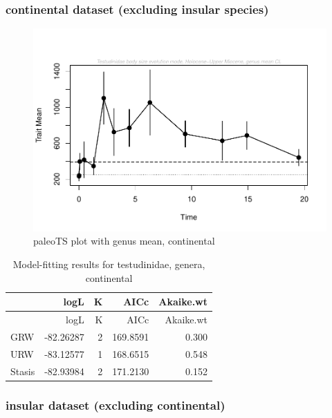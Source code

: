 \FloatBarrier

\subsubsection{continental dataset (excluding insular
	species)}\label{continental-excluding-insular-species}


\begin{figure}[H]
	\centering
	\includegraphics{MA_JJ_files/figure-latex/paleoTSC-1.pdf}
	\caption{paleoTS plot with genus mean, continental}
	\label{fig:pTSC}
\end{figure}

\begin{longtable}[]{@{}lrrrr@{}}
	\caption{Model-fitting results for testudinidae, genera,
		continental}
	\label{tab:pTSCEM}\tabularnewline
	\toprule
	& logL & K & AICc & Akaike.wt\tabularnewline
	\midrule
	\endfirsthead
	\toprule
	& logL & K & AICc & Akaike.wt\tabularnewline
	\midrule
	\endhead
	GRW & -82.26287 & 2 & 169.8591 & 0.300\tabularnewline
	URW & -83.12577 & 1 & 168.6515 & 0.548\tabularnewline
	Stasis & -82.93984 & 2 & 171.2130 & 0.152\tabularnewline
	\bottomrule
\end{longtable}


\FloatBarrier

\subsubsection{insular dataset (excluding
	continental)}\label{insular-excluding-continental}




